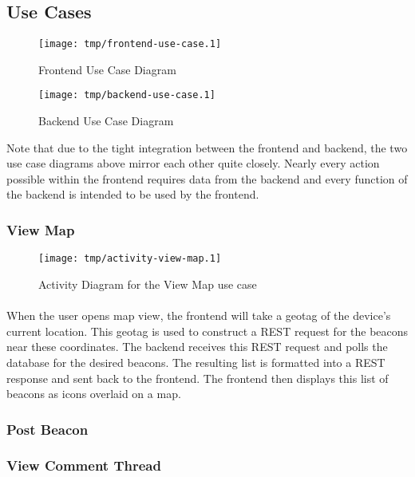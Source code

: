     \subsection{Use Cases}
        \begin{figure}[H]
            \centering
            \texttt{[image: tmp/frontend-use-case.1]} 
            \caption{Frontend Use Case Diagram}
        \end{figure}

        \begin{figure}[H]
            \centering
            \texttt{[image: tmp/backend-use-case.1]} 
            \caption{Backend Use Case Diagram}
        \end{figure}

        Note that due to the tight integration between the frontend and backend,
        the two use case diagrams above mirror each other quite closely.
        Nearly every action possible within the frontend requires data from the
        backend and every function of the backend is intended to be used by the
        frontend.

        \subsubsection{View Map}
        \begin{figure}[H]
            \centering
            \texttt{[image: tmp/activity-view-map.1]} 
            \caption{Activity Diagram for the View Map use case}
        \end{figure}

        \paragraph*{}
        When the user opens map view, the frontend will take a geotag of the device's
        current location. This geotag is used to construct a REST request
        for the beacons near these coordinates.
        The backend receives this REST request and polls the database for the desired
        beacons. The resulting list is formatted into a REST response and sent back
        to the frontend. The frontend then displays this list of beacons as icons
        overlaid on a map.

        \subsubsection{Post Beacon}
        \subsubsection{View Comment Thread}
